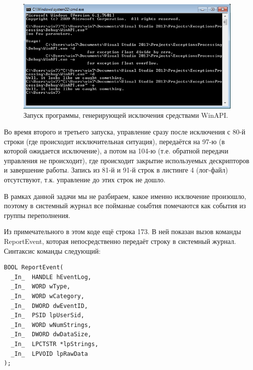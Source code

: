 \documentclass[a4paper, 12pt]{report}		%
\begin{document}
\begin{figure}[h!]
\centering
\includegraphics[scale=0.95]{res/001}
\caption{Запуск программы, генерирующей исключения средствами WinAPI.}
\end{figure}

Во время второго и третьего запуска, управление сразу после исключения с 80-й строки (где происходит исключительная ситуация),  передаётся на 97-ю (в которой ожидается исключение), а потом на 104-ю (т.е. обратной передачи управления не происходит), где происходит закрытие используемых дескрипторов и завершение работы. Запись из 81-й и 91-й строк в листинге 4 (лог-файл) отсутствуют, т.к. управление до этих строк не дошло.

В рамках данной задачи мы не разбираем, какое именно исключение произошло, поэтому в системный журнал все пойманые соыбтия помечаются как события из группы переполнения.



Из примечательного в этом коде ещё строка 173. В ней показан вызов команды ReportEvent, которая непосредственно передаёт строку в системный журнал. Синтаксис команды следующий:

\begin{verbatim}
BOOL ReportEvent(
  _In_  HANDLE hEventLog,
  _In_  WORD wType,
  _In_  WORD wCategory,
  _In_  DWORD dwEventID,
  _In_  PSID lpUserSid,
  _In_  WORD wNumStrings,
  _In_  DWORD dwDataSize,
  _In_  LPCTSTR *lpStrings,
  _In_  LPVOID lpRawData
);
\end{verbatim}
\end{document}
